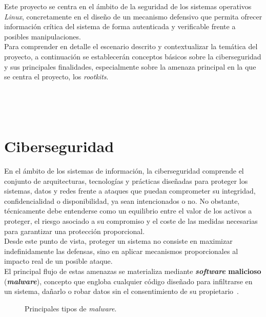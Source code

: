 Este proyecto se centra en el ámbito de la seguridad de los sistemas operativos \textit{Linux}, concretamente en el diseño de un mecanismo defensivo que permita ofrecer información crítica del sistema de forma autenticada y verificable frente a posibles manipulaciones.\\

Para comprender en detalle el escenario descrito y contextualizar la temática del proyecto, a continuación se establecerán conceptos básicos sobre la ciberseguridad y sus principales finalidades, especialmente sobre la amenaza principal en la que se centra el proyecto, los \textit{rootkits}.

\

\

\section{Ciberseguridad}
\label{sec:seccion2}

En el ámbito de los sistemas de información, la ciberseguridad comprende el conjunto de arquitecturas, tecnologías y prácticas diseñadas para proteger los sistemas, datos y redes frente a ataques que puedan comprometer su integridad, confidencialidad o disponibilidad, ya sean intencionados o no.
No obstante, técnicamente debe entenderse como un equilibrio entre el valor de los activos a proteger, el riesgo asociado a su compromiso y el coste de las medidas necesarias para garantizar una protección proporcional.\\

Desde este punto de vista, proteger un sistema no consiste en maximizar indefinidamente las defensas, sino en aplicar mecanismos proporcionales al impacto real de un posible ataque.\\

El principal flujo de estas amenazas se materializa mediante \textbf{\textit{software} malicioso} (\textbf{\textit{malware}}), concepto que engloba cualquier código diseñado para infiltrarse en un sistema, dañarlo o robar datos sin el consentimiento de su propietario~\cite{malware_nist}.\\

\newpage

\begin{figure}[h!]
  \centering
  \scalebox{0.85}{}
  \caption{Principales tipos de \textit{malware}.}
  \label{fig:types-malware}
\end{figure}


